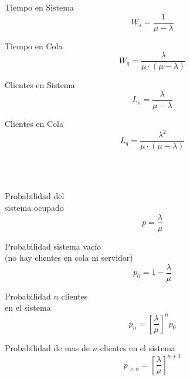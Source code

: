 \documentclass[10pt,letterpaper]{article}
\begin{document}
\begin{enumerate}

\begin{minipage}[t]{.25\textwidth}
\raggedright
\item Tiempo en Sistema
$$
W_s = \dfrac{1}{\mu - \lambda}
$$
\end{minipage}%
\begin{minipage}[t]{.25\textwidth}
\raggedright
\item Tiempo en Cola
$$
W_q = \dfrac{\lambda}{\mu\cdot (\mu - \lambda)}
$$
\end{minipage}%
\begin{minipage}[t]{.25\textwidth}
\raggedright
\item Clientes en Sistema
$$
L_s = \dfrac{\lambda}{\mu - \lambda}
$$
\end{minipage}%
\begin{minipage}[t]{.25\textwidth}
\raggedright
\item Clientes en Cola
$$
L_q = \dfrac{\lambda^2}{\mu\cdot (\mu - \lambda)}
$$
\end{minipage}
\\${ }$\\ 
\begin{minipage}[t]{.20\textwidth}
\raggedright
\item Probabilidad del \\ sistema ocupado
$$
p=\dfrac{\lambda}{\mu}
$$
\end{minipage}%
\begin{minipage}[t]{.3\textwidth}
\raggedright
\item Probabilidad sistema vacío \\(no hay clientes en cola ni servidor)
$$
p_0 = 1-\dfrac{\lambda}{\mu}
$$
\end{minipage}%
\begin{minipage}[t]{.25\textwidth}
\raggedright
\item Probabilidad $n$ clientes \\ en el sistema
$$
p_{n}=\left[ \dfrac{\lambda}{\mu} \right]^{n} p_0
$$
\end{minipage}%
\begin{minipage}[t]{.25\textwidth}
\raggedright
\item Probabilidad de mas de $n$ clientes en el sistema
$$
p_{>n}=\left[ \dfrac{\lambda}{\mu} \right]^{n+1}
$$
\end{minipage}
\end{enumerate}
\end{document}
